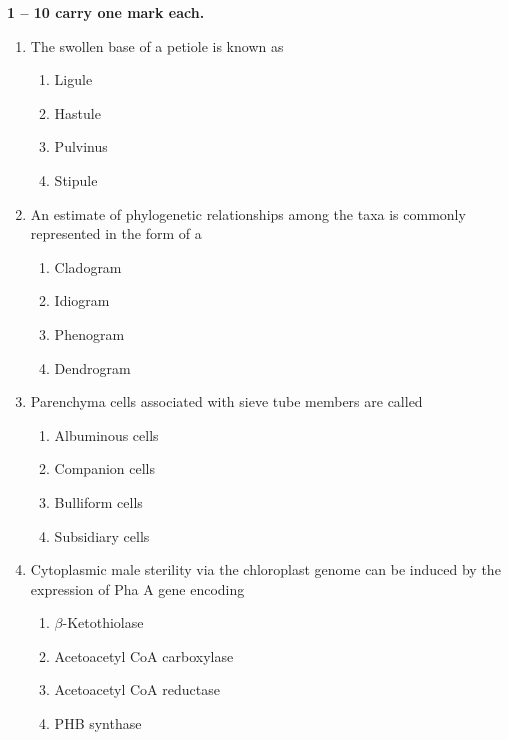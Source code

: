 \documentclass[journal,12pt,onecolumn]{IEEEtran}
\begin{document}
\noindent \textbf{ 1 --  10 carry one mark each.}
\begin{enumerate}[label=\arabic*.]
\item The swollen base of a petiole is known as
\begin{multicols}{4}
\begin{enumerate}[label=(\Alph*)]
\item Ligule
\item Hastule
\item Pulvinus
\item Stipule
\end{enumerate}
\end{multicols}

\item An estimate of phylogenetic relationships among the taxa is commonly represented in the form of a
\begin{multicols}{4}
\begin{enumerate}[label=(\Alph*)]
\item Cladogram
\item Idiogram
\item Phenogram
\item Dendrogram
\end{enumerate}
\end{multicols}

\item Parenchyma cells associated with sieve tube members are called
\begin{multicols}{2}
\begin{enumerate}[label=(\Alph*)]
\item Albuminous cells
\item Companion cells
\item Bulliform cells
\item Subsidiary cells
\end{enumerate}
\end{multicols}

\item Cytoplasmic male sterility via the chloroplast genome can be induced by the expression of Pha A gene encoding
\begin{multicols}{2}
\begin{enumerate}[label=(\Alph*)]
\item $\beta$-Ketothiolase
\item Acetoacetyl CoA carboxylase
\item Acetoacetyl CoA reductase
\item PHB synthase
\end{enumerate}
\end{multicols}


\end{enumerate}
\end{document}
